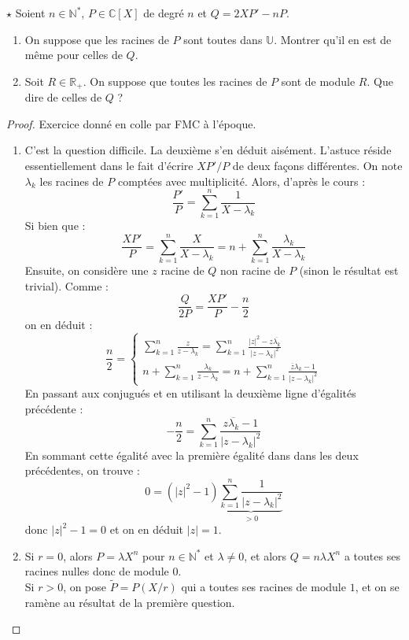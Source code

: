 \documentclass[french,a4paper]{article}
\newcommand{\N}{\mathbb{N}}
\newcommand{\R}{\mathbb{R}}
\newcommand{\C}{\mathbb{C}}
\newcommand{\U}{\mathbb{U}}
\newcommand{\st}{^*}
\theoremstyle{plain}
\theoremstyle{definition}
\theoremstyle{remark}
\begin{document}
\begin{ex}{$\star$}
	Soient $n\in\N\st$, $P\in\C[X]$ de degré $n$ et $Q=2XP'-nP$.
	\begin{enumerate}
		\item On suppose que les racines de $P$ sont toutes dans $\U$. Montrer qu'il en est de même pour celles de $Q$.
		\item Soit $R\in\R_+$. On suppose que toutes les racines de $P$ sont de module $R$. Que dire de celles de $Q$ ?
	\end{enumerate}
\end{ex}
\begin{proof}
	Exercice donné en colle par FMC à l'époque.
	\begin{enumerate}
		\item C'est la question difficile. La deuxième s'en déduit aisément. L'astuce réside essentiellement dans le fait d'écrire $XP'/P$ de deux façons différentes. On note $\lambda_k$ les racines de $P$ comptées avec multiplicité. Alors, d'après le cours : $$\frac{P'}{P}=\sum_{k=1}^{n}\frac{1}{X-\lambda_k}$$ Si bien que : $$\frac{XP'}{P}=\sum_{k=1}^{n}\frac{X}{X-\lambda_k}=n+\sum_{k=1}^{n}\frac{\lambda_k}{X-\lambda_k}$$ Ensuite, on considère une $z$ racine de $Q$ non racine de $P$ (sinon le résultat est trivial). Comme : $$\frac{Q}{2P}=\frac{XP'}{P}-\frac{n}{2}$$ on en déduit : $$\frac{n}{2}=\begin{cases}
			\displaystyle\sum_{k=1}^{n}\frac{z}{z-\lambda_k}=\sum_{k=1}^{n}\frac{\lvert z\rvert^2-z\overline{\lambda_k}}{\lvert z-\lambda_k\rvert^2}\\
			\displaystyle n+\sum_{k=1}^{n}\frac{\lambda_k}{z-\lambda_k}=n+\sum_{k=1}^{n}\frac{\overline{z}\lambda_k-1}{\lvert z-\lambda_k\rvert^2}
		\end{cases}$$ En passant aux conjugués et en utilisant la deuxième ligne d'égalités précédente : $$-\frac{n}{2}=\sum_{k=1}^{n}\frac{z\overline{\lambda_k}-1}{\lvert z-\lambda_k\rvert^2}$$ En sommant cette égalité avec la première égalité dans dans les deux précédentes, on trouve : $$0=(\lvert z\rvert^2-1)\underbrace{\sum_{k=1}^{n}\frac{1}{\lvert z-\lambda_k\rvert^2}}_{>0}$$ donc $\lvert z\rvert^2-1=0$ et on en déduit $\lvert z\rvert=1$.
		\item Si $r=0$, alors $P=\lambda X^n$ pour $n\in\N\st$ et $\lambda\ne 0$, et alors $Q=n\lambda X^n$ a toutes ses racines nulles donc de module $0$. \\
		Si $r>0$, on pose $\tilde{P}=P(X/r)$ qui a toutes ses racines de module $1$, et on se ramène au résultat de la première question.
	\end{enumerate}
\end{proof}
\end{document}
